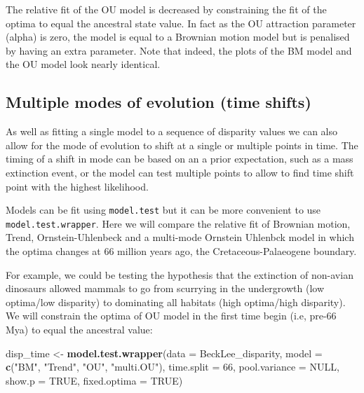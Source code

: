 \documentclass[]{book}
\newenvironment{Shaded}{\begin{snugshade}}{\end{snugshade}}
\newcommand{\KeywordTok}[1]{\textcolor[rgb]{0.13,0.29,0.53}{\textbf{#1}}}
\newcommand{\DataTypeTok}[1]{\textcolor[rgb]{0.13,0.29,0.53}{#1}}
\newcommand{\DecValTok}[1]{\textcolor[rgb]{0.00,0.00,0.81}{#1}}
\newcommand{\StringTok}[1]{\textcolor[rgb]{0.31,0.60,0.02}{#1}}
\newcommand{\OtherTok}[1]{\textcolor[rgb]{0.56,0.35,0.01}{#1}}
\newcommand{\NormalTok}[1]{#1}
\theoremstyle{definition}
\theoremstyle{definition}
\theoremstyle{definition}
\theoremstyle{remark}
\begin{document}
The relative fit of the OU model is decreased by constraining the fit of
the optima to equal the ancestral state value. In fact as the OU
attraction parameter (alpha) is zero, the model is equal to a Brownian
motion model but is penalised by having an extra parameter. Note that
indeed, the plots of the BM model and the OU model look nearly
identical.

\subsection{Multiple modes of evolution (time
shifts)}\label{multiple-modes-of-evolution-time-shifts}

As well as fitting a single model to a sequence of disparity values we
can also allow for the mode of evolution to shift at a single or
multiple points in time. The timing of a shift in mode can be based on
an a prior expectation, such as a mass extinction event, or the model
can test multiple points to allow to find time shift point with the
highest likelihood.

Models can be fit using \texttt{model.test} but it can be more
convenient to use \texttt{model.test.wrapper}. Here we will compare the
relative fit of Brownian motion, Trend, Ornstein-Uhlenbeck and a
multi-mode Ornstein Uhlenbck model in which the optima changes at 66
million years ago, the Cretaceous-Palaeogene boundary.

For example, we could be testing the hypothesis that the extinction of
non-avian dinosaurs allowed mammals to go from scurrying in the
undergrowth (low optima/low disparity) to dominating all habitats (high
optima/high disparity). We will constrain the optima of OU model in the
first time begin (i.e, pre-66 Mya) to equal the ancestral value:

\begin{Shaded}
\begin{Highlighting}[]
\NormalTok{disp_time <-}\StringTok{ }\KeywordTok{model.test.wrapper}\NormalTok{(}\DataTypeTok{data =}\NormalTok{ BeckLee_disparity, }\DataTypeTok{model =} \KeywordTok{c}\NormalTok{(}\StringTok{"BM"}\NormalTok{, }\StringTok{"Trend"}\NormalTok{, }\StringTok{"OU"}\NormalTok{, }\StringTok{"multi.OU"}\NormalTok{),}
                                \DataTypeTok{time.split =} \DecValTok{66}\NormalTok{, }\DataTypeTok{pool.variance =} \OtherTok{NULL}\NormalTok{, }\DataTypeTok{show.p =} \OtherTok{TRUE}\NormalTok{,}
                                \DataTypeTok{fixed.optima =} \OtherTok{TRUE}\NormalTok{)}
\end{Highlighting}
\end{Shaded}
\end{document}

